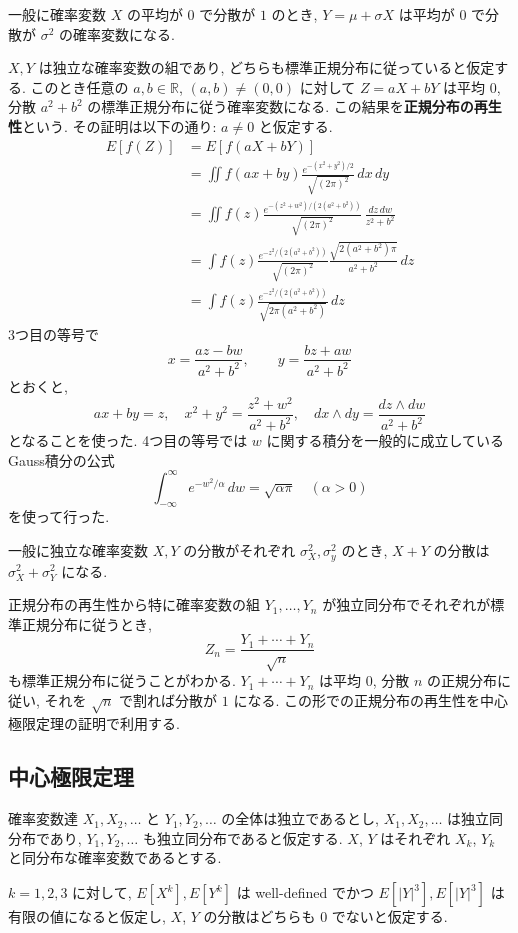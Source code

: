 \documentclass[12pt,twoside]{jarticle}
\newcommand\R{{\mathbb R}} %
\theoremstyle{jplain}
\theoremstyle{jplain}
\theoremstyle{jplain}
\numberwithin{theorem}{section}
\numberwithin{equation}{section}
\numberwithin{figure}{section}
\numberwithin{table}{section}
\begin{document}
一般に確率変数 $X$ の平均が $0$ で分散が $1$ のとき, $Y=\mu+\sigma X$ は平均が $0$ で分散が $\sigma^2$ の確率変数になる.

$X,Y$ は独立な確率変数の組であり, どちらも標準正規分布に従っていると仮定する. このとき任意の $a,b\in\R$, $(a,b)\ne(0,0)$ に対して $Z=aX+bY$ は平均 $0$, 分散 $a^2+b^2$ の標準正規分布に従う確率変数になる. この結果を{\bfseries 正規分布の再生性}という. その証明は以下の通り: $a\ne 0$ と仮定する.
\begin{align*}
E[f(Z)]
&=E[f(aX+bY)]\\
&=\iint f(ax+by)\frac{e^{-(x^2+y^2)/2}}{\sqrt{(2\pi)^2}}\,dx\,dy \\
&=\iint f(z)\frac{e^{-(z^2+w^2)/(2(a^2+b^2))}}{\sqrt{(2\pi)^2}}\,\frac{dz\,dw}{z^2+b^2}\\
&=\int f(z)\frac{e^{-z^2/(2(a^2+b^2))}}{\sqrt{(2\pi)^2}}\frac{\sqrt{2(a^2+b^2)\pi}}{a^2+b^2}\,dz\\
&=\int f(z)\frac{e^{-z^2/(2(a^2+b^2))}}{\sqrt{2\pi(a^2+b^2)}}\,dz
\end{align*}
3つ目の等号で
$$
x = \frac{az-bw}{a^2+b^2}, \qquad y = \frac{bz+aw}{a^2+b^2}
$$
とおくと,
$$
ax+by=z, \quad x^2+y^2=\frac{z^2+w^2}{a^2+b^2}, \quad dx\wedge dy = \frac{dz\wedge dw}{a^2+b^2}
$$
となることを使った. 4つ目の等号では $w$ に関する積分を一般的に成立しているGauss積分の公式
$$
\int_{-\infty}^\infty e^{-w^2/\alpha}\,dw = \sqrt{\alpha\pi}
\quad (\alpha > 0)
$$
を使って行った.

一般に独立な確率変数 $X,Y$ の分散がそれぞれ $\sigma_X^2,\sigma_y^2$ のとき, $X+Y$ の分散は $\sigma_X^2+\sigma_Y^2$ になる.

正規分布の再生性から特に確率変数の組 $Y_1,\ldots,Y_n$ が独立同分布でそれぞれが標準正規分布に従うとき,
$$
Z_n = \frac{Y_1+\cdots+Y_n}{\sqrt n}
$$
も標準正規分布に従うことがわかる. $Y_1+\cdots+Y_n$ は平均 $0$, 分散 $n$ の正規分布に従い, それを $\sqrt n$ で割れば分散が $1$ になる. この形での正規分布の再生性を中心極限定理の証明で利用する.

\subsection{中心極限定理}

確率変数達 $X_1,X_2,\ldots$ と $Y_1,Y_2,\ldots$ の全体は独立であるとし, $X_1,X_2,\ldots$ は独立同分布であり, $Y_1,Y_2,\ldots$ も独立同分布であると仮定する. $X$, $Y$ はそれぞれ $X_k$, $Y_k$ と同分布な確率変数であるとする.

$k=1,2,3$ に対して, $E[X^k], E[Y^k]$ は well-defined でかつ $E[|Y|^3],E[|Y|^3]$ は有限の値になると仮定し, $X$, $Y$ の分散はどちらも 0 でないと仮定する.
\end{document}
